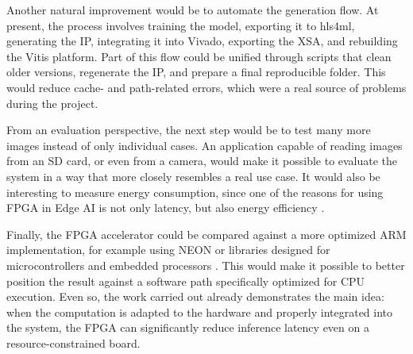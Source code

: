 Another natural improvement would be to automate the generation flow. At present, the
process involves training the model, exporting it to hls4ml, generating the \ac{IP},
integrating it into Vivado, exporting the \ac{XSA}, and rebuilding the Vitis platform. Part
of this flow could be unified through scripts that clean older versions, regenerate the
\ac{IP}, and prepare a final reproducible folder. This would reduce cache- and path-related
errors, which were a real source of problems during the project.

From an evaluation perspective, the next step would be to test many more images instead
of only individual cases. An application capable of reading images from an \ac{SD} card, or
even from a camera, would make it possible to evaluate the system in a way that more
closely resembles a real use case. It would also be interesting to measure energy
consumption, since one of the reasons for using \ac{FPGA} in Edge AI is not only latency,
but also energy efficiency \citep{sze2017efficientprocessingdeepneural}.

Finally, the \ac{FPGA} accelerator could be compared against a more optimized \ac{ARM}
implementation, for example using NEON or libraries designed for microcontrollers and
embedded processors \citep{lai2018cmsisnnefficientneuralnetwork}. This would make it
possible to better position the result against a software path specifically optimized
for \ac{CPU} execution. Even so, the work carried out already demonstrates the main idea:
when the computation is adapted to the hardware and properly integrated into the system,
the \ac{FPGA} can significantly reduce inference latency even on a resource-constrained
board.

